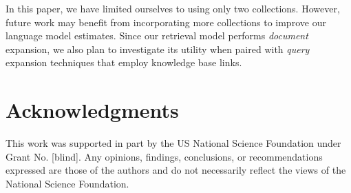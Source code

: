 \documentclass{article}
\begin{document}
In this paper, we have limited ourselves to using only two collections. However, future work may benefit from incorporating more collections to improve our language model estimates. Since our retrieval model performs \textit{document} expansion, we also plan to investigate its utility when paired with \textit{query} expansion techniques that employ knowledge base links.

\section{Acknowledgments}\label{section.acknowledgments}
This work was supported in part by the US National Science Foundation under Grant No. [blind]. Any opinions, findings, conclusions, or recommendations expressed are those of the authors and do not necessarily reflect the views of the National Science Foundation.



  
\end{document}
